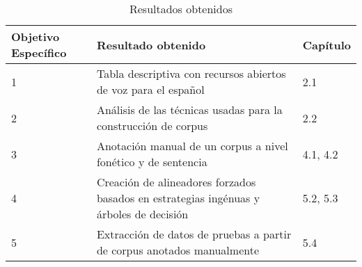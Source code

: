 \begin{table}[H]
\centering
\caption{Resultados obtenidos}
\label{tab:resultados_obtenidos}
\begin{tabular}{|l|l|l|}
\hline
\multicolumn{1}{|p{2.3cm}|}{\textbf{Objetivo Específico}}  & \textbf{Resultado obtenido}  & \textbf{Capítulo}\\
\hline
1 & Tabla descriptiva con recursos abiertos de voz para el español & 2.1 \\
\hline
2 & Análisis de las técnicas usadas para la construcción de corpus & 2.2 \\
\hline
3 & Anotación manual de un corpus a nivel fonético y de sentencia & 4.1, 4.2 \\
\hline
4 & \multicolumn{1}{|p{12cm}|}{Creación de alineadores forzados basados en estrategias ingénuas y árboles de decisión} & 5.2, 5.3 \\
\hline
5 & \multicolumn{1}{|p{12cm}|}{Extracción de datos de pruebas a partir de corpus anotados manualmente} & 5.4 \\
\hline
\end{tabular}
\end{table}